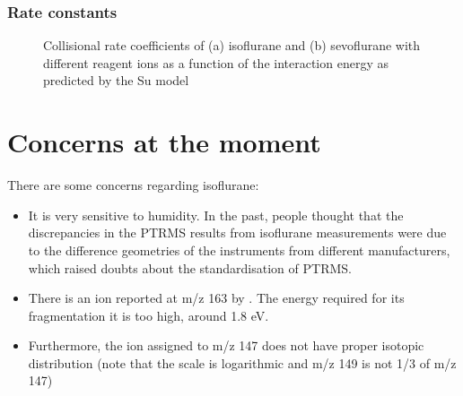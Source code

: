 \subsubsection{Rate constants}

\begin{figure}%
\centering
{}

\caption{Collisional rate coefficients of (a) isoflurane and (b) sevoflurane with different reagent ions as a function of the interaction energy as predicted by the Su model \cite{su1994parametrization}}
    \label{fig:rate_iso_sevo}
\end{figure}



\section{Concerns at the moment}
There are some concerns regarding isoflurane:
\begin{itemize}
    \item It is very sensitive to humidity. In the past, people thought that the discrepancies in the PTRMS results from isoflurane measurements were due to the difference geometries of the instruments from different manufacturers, which raised doubts about the standardisation of PTRMS.
    \item There is an ion reported at m/z 163 by \cite{Wang2002SelectedSevoflurane}. The energy required for its fragmentation it is too high, around 1.8 eV.
    \item Furthermore, the ion assigned to m/z 147 does not have proper isotopic distribution (note that the scale is logarithmic and m/z 149 is not 1/3 of m/z  147)
\end{itemize}




